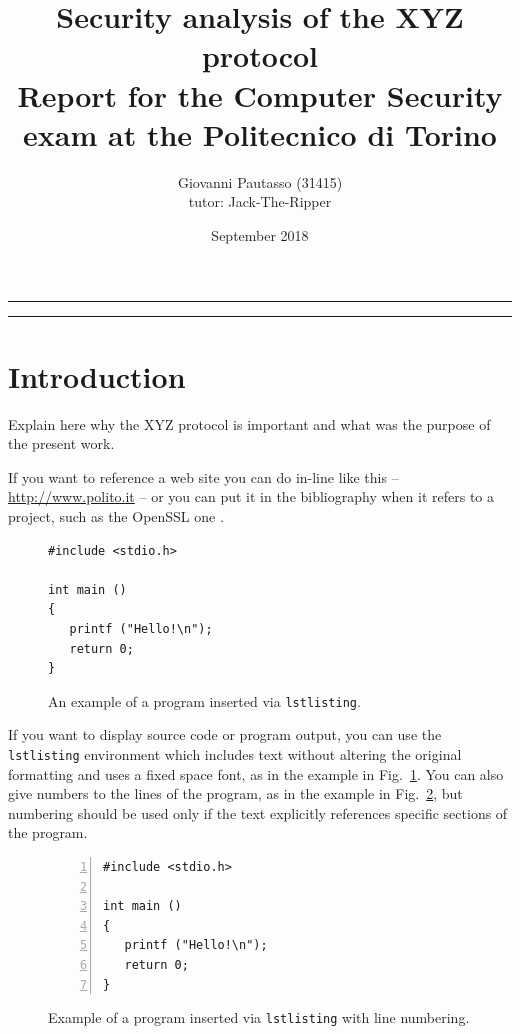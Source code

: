 \documentclass[a4paper,12pt]{article}
\newcommand{\cmd}[1]{\texttt{#1}\xspace}
\begin{document}
\title{Security analysis of the XYZ protocol
\\
{\normalsize Report for the Computer Security exam at the Politecnico di Torino}
}
\author{Giovanni Pautasso (31415)
\\
{\normalsize tutor: Jack-The-Ripper}
}
\date{September 2018}
\maketitle

\vfill

\rule{\textwidth}{1pt}

\tableofcontents

\rule{\textwidth}{1pt}

\vfill

\newpage

\section{Introduction}

Explain here why the XYZ protocol is important
and what was the purpose of the present work.

If you want to reference a web site you can do in-line like this --
\url{http://www.polito.it} -- or you can put it in the bibliography when it refers to a project, such as the OpenSSL one \cite{openssl}.

\begin{figure}[tb]
\begin{lstlisting}
#include <stdio.h>

int main ()
{
   printf ("Hello!\n");
   return 0;
}
\end{lstlisting}
\caption{An example of a program inserted via \cmd{lstlisting}.\label{fig:prog}}
\end{figure}
If you want to display source code or program output, you can use the \cmd{lstlisting} environment which includes text without altering the original formatting and uses a fixed space font, as in the example in Fig.~\ref{fig:prog}.
You can also give numbers to the lines of the program, as in the example in Fig.~\ref{fig:prog-num}, but numbering should be used only if the text explicitly references  specific sections of the  program.

\begin{figure}[tb]
\begin{lstlisting}[numbers=left]
#include <stdio.h>

int main ()
{
   printf ("Hello!\n");
   return 0;
}
\end{lstlisting}
\caption{Example of a program inserted via \cmd{lstlisting} with line numbering.\label{fig:prog-num}}
\end{figure}
\end{document}
